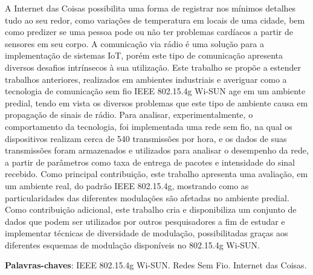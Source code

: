\setlength{\absparsep}{18pt} %
\begin{resumo}
  A Internet das Coisas possibilita uma forma de registrar nos mínimos detalhes tudo ao seu redor, como variações de temperatura em locais de uma cidade, bem como predizer se uma pessoa pode ou não ter problemas cardíacos a partir de sensores em seu corpo. A comunicação via rádio é uma solução para a implementação de sistemas IoT, porém este tipo de comunicação apresenta diversos desafios intrínsecos à sua utilização. Este trabalho se propõe a estender trabalhos anteriores, realizados em ambientes industriais e averiguar como a tecnologia de comunicação sem fio IEEE 802.15.4g Wi-SUN age em um ambiente predial, tendo em vista os diversos problemas que este tipo de ambiente causa em propagação de sinais de rádio. Para analisar, experimentalmente, o comportamento da tecnologia, foi implementada uma rede sem fio, na qual os dispositivos realizam cerca de 540 transmissões por hora, e os dados de suas transmissões foram armazenados e utilizados para analisar o desempenho da rede, a partir de parâmetros como taxa de entrega de pacotes e intensidade do sinal recebido. Como principal contribuição, este trabalho apresenta uma avaliação, em um ambiente real, do padrão IEEE 802.15.4g, mostrando como as particularidades das diferentes modulações são afetadas no ambiente predial. Como contribuição adicional, este trabalho cria e disponibiliza um conjunto de dados que podem ser utilizados por outros pesquisadores a fim de estudar e implementar técnicas de diversidade de modulação, possibilitadas graças aos diferentes esquemas de modulação disponíveis no 802.15.4g Wi-SUN.


  \textbf{Palavras-chaves}: IEEE 802.15.4g Wi-SUN. Redes Sem Fio. Internet das Coisas.
\end{resumo}

